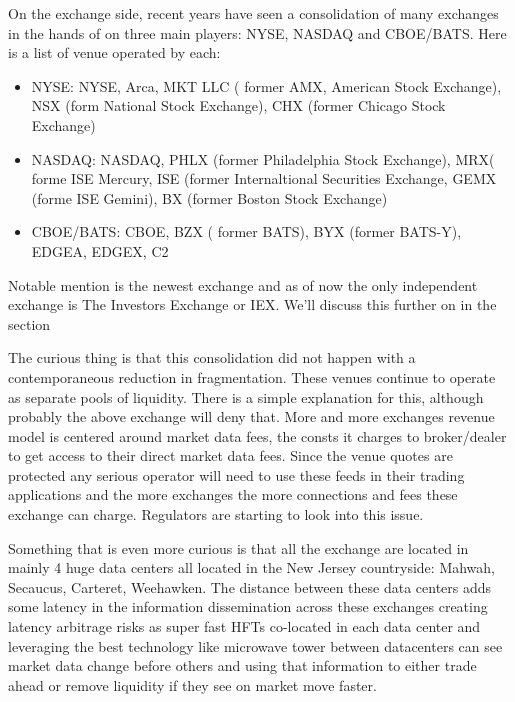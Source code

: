 On the exchange side, recent years have seen a consolidation of many exchanges in the hands of on three main players: NYSE, NASDAQ and CBOE/BATS. Here is a list of venue operated by each:
\begin{itemize}
\item NYSE: NYSE, Arca, MKT LLC ( former AMX, American Stock Exchange), NSX (form National Stock Exchange), CHX (former Chicago Stock Exchange)
\item NASDAQ:  NASDAQ, PHLX (former Philadelphia Stock Exchange), MRX( forme ISE Mercury, ISE (former Internaltional Securities Exchange, GEMX (forme ISE Gemini), BX (former Boston Stock Exchange)
\item CBOE/BATS: CBOE, BZX ( former BATS), BYX (former BATS-Y), EDGEA, EDGEX, C2
\end{itemize}

Notable mention is the newest exchange and as of now the only independent exchange is The Investors Exchange or IEX. We'll discuss this further on in the section

The curious thing is that this consolidation did not happen with a contemporaneous reduction in fragmentation. These venues continue to operate as separate pools of liquidity. There is a simple explanation for this, although probably the above exchange will deny that. More and more exchanges revenue model is centered around market data fees, the consts it charges to broker/dealer to get access to their direct market data fees. Since the venue quotes are protected any serious operator will need to use these feeds in their trading applications and the more exchanges the more connections and fees these exchange can charge. Regulators are starting to look into this issue.

Something that is even more curious is that all the exchange are located in mainly 4 huge data centers all located in the New Jersey countryside: Mahwah, Secaucus, Carteret, Weehawken. The distance between these data centers adds some latency in the information dissemination across these exchanges creating latency arbitrage risks as super fast HFTs co-located in each data center and leveraging the best technology like microwave tower between datacenters can see market data change before others and using that information to either trade ahead or remove liquidity if they see on market move faster. 

